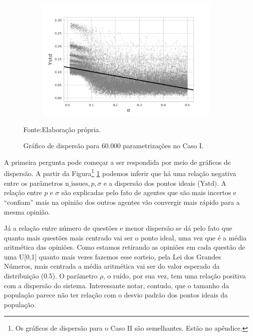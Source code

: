 \begin{figure}[h]
                \begin{subfigure}[b]{0.49\textwidth}
            \includegraphics[width=\textwidth]{ims/mutoregressions/regressionmutatingosigma.png}
    \end{subfigure}
    \caption{Gráfico de dispersão para 60.000 parametrizações no Caso I.}
    \label{fig:scatter1}
    Fonte:Elaboração própria.
\end{figure}

A primeira pergunta pode começar a ser respondida por meio de gráficos de
dispersão. A partir da Figura\footnote{Os gráficos de dispersão para o Caso II
  são semelhantes. Estão no apêndice.} \ref{fig:scatter1} podemos inferir que há
uma relação negativa entre os parâmetros \(\text{n\_issues}, p, \sigma \) e a
dispersão dos pontos ideais (\( \text{Ystd}) \). A relação entre \(p\) e \(\sigma\)
são explicadas pelo fato de agentes que são mais incertos e ``confiam'' mais na
opinião dos outros agentes vão convergir mais rápido para a mesma opinião.

Já a relação entre número de questões e menor dispersão se dá pelo fato que
quanto mais questões mais centrado vai ser o ponto ideal, uma vez que é a média
aritmética das opiniões. Como estamos retirando as opiniões em cada questão de
uma U[0,1] quanto mais vezes fazemos esse sorteio, pela Lei dos Grandes Números,
mais centrada a média aritmética vai ser do valor esperado da distribuição
(0.5). O parâmetro \(\rho\), o ruído, por sua vez, tem uma relação positiva com a
dispersão do sistema. Interessante notar, contudo, que o tamanho da população
parece não ter relação com o desvio padrão dos pontos ideais da população.

